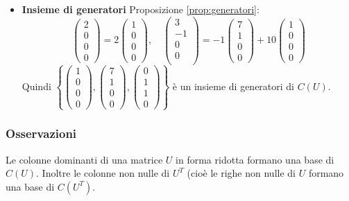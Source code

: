 \documentclass[a4paper]{article}
\theoremstyle{break}
\theoremstyle{break}
\theoremstyle{break}
\theoremstyle{break}
\begin{document}
\begin{example}
\begin{itemize}
   \item \textbf{Insieme di generatori} Proposizione \ref{prop:generatori}:
     \[
     \begin{pmatrix} 
       2\\
       0\\
       0\\
       0
     \end{pmatrix} 
     =
     2 \begin{pmatrix} 1\\0\\0\\0 \end{pmatrix}, \quad
     \begin{pmatrix} 
       3\\
       -1\\
       0\\
       0\\
     \end{pmatrix} 
     =
     -1 \begin{pmatrix} 7\\1\\0\\0 \end{pmatrix} +
     10 \begin{pmatrix} 1\\0\\0\\0 \end{pmatrix}
     \] 
     Quindi \( \left\{ \begin{pmatrix} 
         1\\0\\0\\0
     \end{pmatrix},
     \begin{pmatrix} 
       7\\1\\0\\0
     \end{pmatrix} ,
     \begin{pmatrix} 
       0\\1\\1\\0
     \end{pmatrix} 
   \right\}  \) è un insieme di generatori di \( C(U) \).
  \end{itemize}
\end{example}

\subsubsection{Osservazioni}
Le colonne dominanti di una matrice \( U \) in forma ridotta formano una base di \( C(U) \).
Inoltre le colonne non nulle di \( U^T \) (cioè le righe non nulle di \( U \) formano una
base di \( C(U^T) \).
\end{document}
